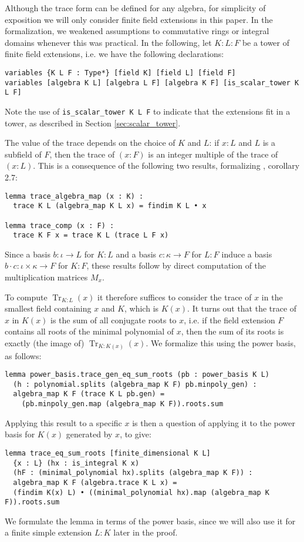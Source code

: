 \documentclass[a4paper,USenglish,cleveref, autoref, thm-restate]{lipics-v2021}
\newcommand{\lean}[1]{\texttt{#1}\xspace} %
\DeclareMathOperator{\Tr}{\mathrm{Tr}}
\begin{document}
Although the trace form can be defined for any algebra,
for simplicity of exposition we will only consider finite field extensions in this paper. %
In the formalization, we weakened assumptions to commutative rings or integral domains whenever this was practical.
In the following, let $K : L : F$ be a tower of finite field extensions, 
i.e. we have the following declarations:
\begin{lstlisting}
variables {K L F : Type*} [field K] [field L] [field F]
variables [algebra K L] [algebra L F] [algebra K F] [is_scalar_tower K L F]
\end{lstlisting}
Note the use of \lean{is\_scalar\_tower K L F} to indicate that the extensions fit in a tower, as described in Section \ref{sec:scalar_tower}.

The value of the trace depends on the choice of $K$ and $L$: if $x : L$ and $L$ is a subfield of $F$,
then the trace of $(x : F)$ is an integer multiple of the trace of $(x : L)$.
This is a consequence of the following two results, formalizing \cite{Neukirch}, corollary 2.7: %
\begin{lstlisting}
lemma trace_algebra_map (x : K) :
  trace K L (algebra_map K L x) = findim K L • x

lemma trace_comp (x : F) :
  trace K F x = trace K L (trace L F x)
\end{lstlisting}
Since a basis $b : \iota \to L$ for $K : L$ and a basis $c : \kappa \to F$ for $L : F$ induce a basis $b \cdot c : \iota \times \kappa \to F$ for $K : F$,
these results follow by direct computation of the multiplication matrices $M_x$.

To compute $\Tr_{K : L}(x)$ it therefore suffices to consider the trace of $x$ in the smallest field containing $x$ and $K$, which is $K(x)$.
It turns out that the trace of $x$ in $K(x)$ is the sum of all conjugate roots to $x$,
i.e. if the field extension $F$ contains all roots of the minimal polynomial of $x$, then the sum of its roots is exactly (the image of) $\Tr_{K : K(x)}(x)$.
We formalize this using the power basis, as follows:
\begin{lstlisting}
lemma power_basis.trace_gen_eq_sum_roots (pb : power_basis K L)
  (h : polynomial.splits (algebra_map K F) pb.minpoly_gen) :
  algebra_map K F (trace K L pb.gen) =
    (pb.minpoly_gen.map (algebra_map K F)).roots.sum
\end{lstlisting}
Applying this result to a specific $x$ is then a question of applying it to the power basis for $K(x)$ generated by $x$, to give:
\begin{lstlisting}
lemma trace_eq_sum_roots [finite_dimensional K L]
  {x : L} (hx : is_integral K x)
  (hF : (minimal_polynomial hx).splits (algebra_map K F)) :
  algebra_map K F (algebra.trace K L x) =
  (findim K(x) L) • ((minimal_polynomial hx).map (algebra_map K F)).roots.sum
\end{lstlisting}
We formulate the lemma in terms of the power basis, since we will also use it for a finite simple extension $L : K$ later in the proof.
\end{document}
